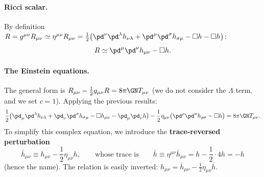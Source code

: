 \paragraph{Ricci scalar.} By definition $R=g^{\mu\nu}R_{\mu\nu}\simeq\eta^{\mu\nu}R_{\mu\nu}=\frac12\big(\pd^\nu\pd^\lambda h_{\nu\lambda}+\pd^\mu\pd^\sigma h_{\sigma\mu}-\Box h-\Box h\big)$:
\begin{equation}
  R\simeq\pd^\mu\pd^\nu h_{\mu\nu}-\Box h .
\end{equation}

\paragraph{The Einstein equations.} The general form is $R_{\mu\nu}-\frac12g_{\mu\nu}R=8\pi\GN T_{\mu\nu}$ (we do not consider the $\Lambda$ term, and we set $c=1$). Applying the previous results:
\begin{equation}
  \frac12\big(\pd_\mu\pd^\lambda h_{\nu\lambda}+\pd_\nu\pd^\sigma h_{\sigma\mu}-\Box h_{\mu\nu}-\pd_\mu\pd_\nu h\big)-\frac12\eta_{\mu\nu}\big(\pd^\rho\pd^\sigma h_{\rho\sigma}-\Box h\big)=8\pi\GN T_{\mu\nu}.
  \label{eq:lin-efe-h}
\end{equation}
To simplify this complex equation, we introduce the \textbf{trace-reversed perturbation}
\begin{equation}
  \bar h_{\mu\nu}\equiv h_{\mu\nu}-\frac12\eta_{\mu\nu}h ,\qquad\text{whose trace is}\qquad\bar h\equiv\eta^{\mu\nu}\bar h_{\mu\nu}=h-\frac12\cdot4h=-h
\end{equation}
(hence the name). The relation is easily inverted: $h_{\mu\nu}=\bar h_{\mu\nu}-\frac12\eta_{\mu\nu}\bar h$.

